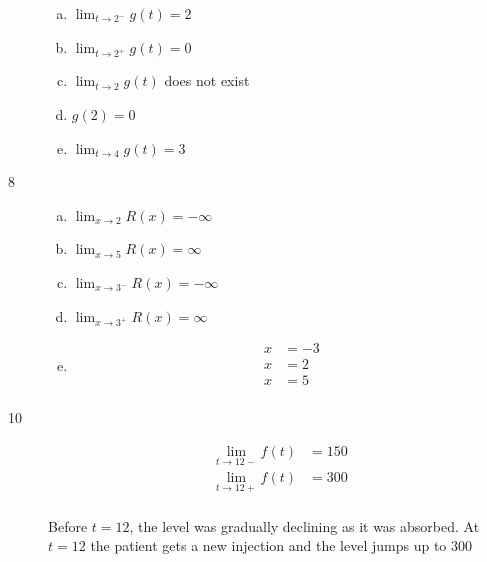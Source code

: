 \documentclass[letterpaper, landscape]{exam}
\begin{document}
\begin{description}
\begin{enumerate}[(a)]
          \item $\lim_{t \to 2^-} g(t) = 2$
          \item $\lim_{t \to 2^+} g(t) = 0$
          \item $\lim_{t \to 2} g(t)$ does not exist
          \item $g(2) = 0$

          \item $\lim_{t \to 4} g(t) = 3$
        \end{enumerate}

      \item[8]
        \begin{enumerate}[(a)]
          \item $\lim_{x \to 2} R(x) = -\infty$
          \item $\lim_{x \to 5} R(x) = \infty$
          \item $\lim_{x \to 3^-} R(x) = -\infty$
          \item $\lim_{x \to 3^+} R(x) = \infty$

          \item
            \begin{align*}
              x & = -3 \\
              x & = 2 \\
              x & = 5 \\
            \end{align*}

        \end{enumerate}

      \item[10]
        \begin{align*}
          \lim_{t \to 12-} f(t) &= 150 \\
          \lim_{t \to 12+} f(t) &= 300 \\
        \end{align*}

        Before $t = 12$, the level was gradually declining as it was absorbed.
        At $t = 12$ the patient gets a new injection and the level jumps up to 300




\end{description}
\end{document}
